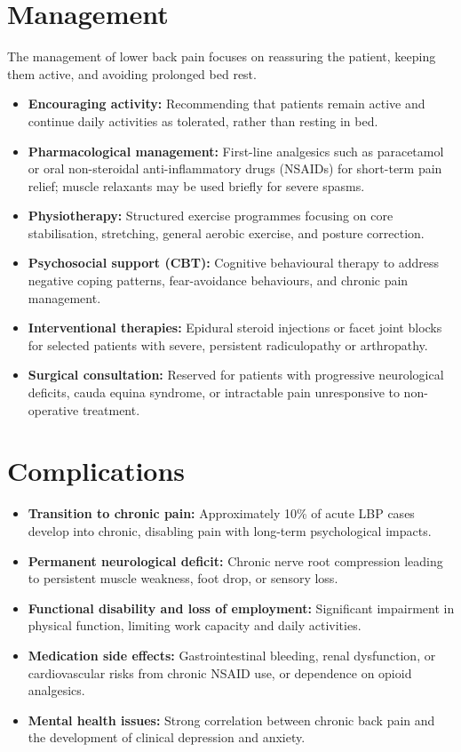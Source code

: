 \section*{Management}
The management of lower back pain focuses on reassuring the patient, keeping them active, and avoiding prolonged bed rest.
\begin{itemize}
    \item \textbf{Encouraging activity:} Recommending that patients remain active and continue daily activities as tolerated, rather than resting in bed.
    \item \textbf{Pharmacological management:} First-line analgesics such as paracetamol or oral non-steroidal anti-inflammatory drugs (NSAIDs) for short-term pain relief; muscle relaxants may be used briefly for severe spasms.
    \item \textbf{Physiotherapy:} Structured exercise programmes focusing on core stabilisation, stretching, general aerobic exercise, and posture correction.
    \item \textbf{Psychosocial support (CBT):} Cognitive behavioural therapy to address negative coping patterns, fear-avoidance behaviours, and chronic pain management.
    \item \textbf{Interventional therapies:} Epidural steroid injections or facet joint blocks for selected patients with severe, persistent radiculopathy or arthropathy.
    \item \textbf{Surgical consultation:} Reserved for patients with progressive neurological deficits, cauda equina syndrome, or intractable pain unresponsive to non-operative treatment.
\end{itemize}

\section*{Complications}
\begin{itemize}
    \item \textbf{Transition to chronic pain:} Approximately 10\% of acute LBP cases develop into chronic, disabling pain with long-term psychological impacts.
    \item \textbf{Permanent neurological deficit:} Chronic nerve root compression leading to persistent muscle weakness, foot drop, or sensory loss.
    \item \textbf{Functional disability and loss of employment:} Significant impairment in physical function, limiting work capacity and daily activities.
    \item \textbf{Medication side effects:} Gastrointestinal bleeding, renal dysfunction, or cardiovascular risks from chronic NSAID use, or dependence on opioid analgesics.
    \item \textbf{Mental health issues:} Strong correlation between chronic back pain and the development of clinical depression and anxiety.
\end{itemize}

